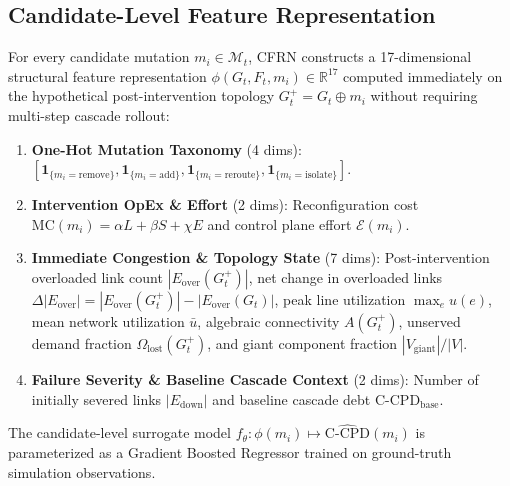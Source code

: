 \documentclass[pdflatex,sn-mathphys-num]{sn-jnl}
\theoremstyle{thmstyleone}
\theoremstyle{thmstyletwo}
\theoremstyle{thmstylethree}
\begin{document}
\subsection{Candidate-Level Feature Representation}
For every candidate mutation $m_i \in \mathcal{M}_t$, CFRN constructs a 17-dimensional structural feature representation $\phi(G_t, F_t, m_i) \in \mathbb{R}^{17}$ computed immediately on the hypothetical post-intervention topology $G_t^+ = G_t \oplus m_i$ without requiring multi-step cascade rollout:
\begin{enumerate}
    \item \textbf{One-Hot Mutation Taxonomy} (4 dims): $[\mathbf{1}_{\{m_i = \mathrm{remove}\}}, \mathbf{1}_{\{m_i = \mathrm{add}\}}, \mathbf{1}_{\{m_i = \mathrm{reroute}\}}, \mathbf{1}_{\{m_i = \mathrm{isolate}\}}]$.
    \item \textbf{Intervention OpEx \& Effort} (2 dims): Reconfiguration cost $\mathrm{MC}(m_i) = \alpha L + \beta S + \chi E$ and control plane effort $\mathcal{E}(m_i)$.
    \item \textbf{Immediate Congestion \& Topology State} (7 dims): Post-intervention overloaded link count $|E_{\mathrm{over}}(G_t^+)|$, net change in overloaded links $\Delta |E_{\mathrm{over}}| = |E_{\mathrm{over}}(G_t^+)| - |E_{\mathrm{over}}(G_t)|$, peak line utilization $\max_e u(e)$, mean network utilization $\bar{u}$, algebraic connectivity $A(G_t^+)$, unserved demand fraction $\Omega_{\mathrm{lost}}(G_t^+)$, and giant component fraction $|V_{\mathrm{giant}}|/|V|$.
    \item \textbf{Failure Severity \& Baseline Cascade Context} (2 dims): Number of initially severed links $|E_{\mathrm{down}}|$ and baseline cascade debt $\mathrm{C\text{-}CPD}_{\mathrm{base}}$.
\end{enumerate}

The candidate-level surrogate model $f_\theta: \phi(m_i) \mapsto \hat{\mathrm{C\text{-}CPD}}(m_i)$ is parameterized as a Gradient Boosted Regressor \cite{friedman2001greedy} trained on ground-truth simulation observations.
\end{document}
